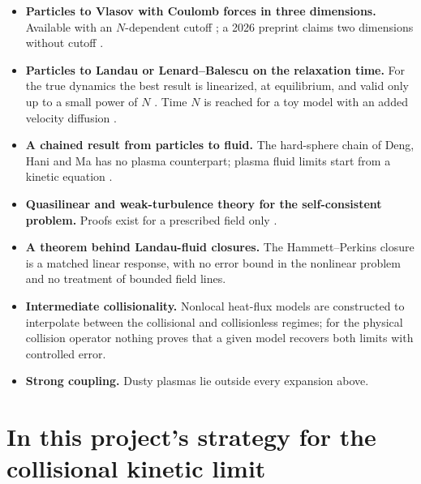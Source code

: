 \documentclass[11pt]{article}
\theoremstyle{remark}
\begin{document}
\begin{itemize}
  \item \textbf{Particles to Vlasov with Coulomb forces in three
    dimensions.} Available with an $N$-dependent cutoff
    \cite{LazaroviciPickl}; a 2026 preprint claims two dimensions without
    cutoff \cite{DuerinckxJabin}.
  \item \textbf{Particles to Landau or Lenard--Balescu on the relaxation
    time.} For the true dynamics the best result is linearized, at
    equilibrium, and valid only up to a small power of $N$
    \cite{DuerinckxSR}. Time $N$ is reached for a toy model with an added
    velocity diffusion \cite{DuerinckxLeBihan}.
  \item \textbf{A chained result from particles to fluid.} The hard-sphere
    chain of Deng, Hani and Ma \cite{DHM2} has no plasma counterpart; plasma
    fluid limits start from a kinetic equation \cite{GuoJang}.
  \item \textbf{Quasilinear and weak-turbulence theory for the
    self-consistent problem.} Proofs exist for a prescribed field only
    \cite{BardosBesse}.
  \item \textbf{A theorem behind Landau-fluid closures.} The
    Hammett--Perkins closure \cite{HP90} is a matched linear response, with
    no error bound in the nonlinear problem and no treatment of bounded
    field lines.
  \item \textbf{Intermediate collisionality.} Nonlocal heat-flux models are
    constructed to interpolate between the collisional and collisionless
    regimes; for the physical collision operator nothing proves that a given
    model recovers both limits with controlled error.
  \item \textbf{Strong coupling.} Dusty plasmas lie outside every expansion
    above.
\end{itemize}

\section{In this project's strategy for the collisional kinetic limit}
\end{document}
